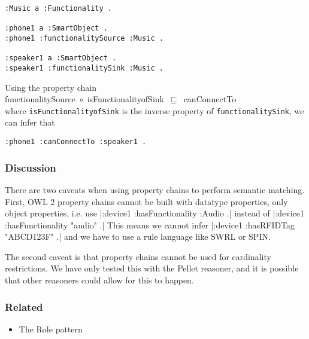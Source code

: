 \begin{verbatim}               
:Music a :Functionality .

:phone1 a :SmartObject .
:phone1 :functionalitySource :Music . 
              
:speaker1 a :SmartObject .
:speaker1 :functionalitySink :Music . 
\end{verbatim}

Using the property chain\\

\noindent
functionalitySource~\ensuremath{\circ}~isFunctionalityofSink~\ensuremath{\sqsubseteq}~canConnectTo\\

where \texttt{isFunctionalityofSink} is the inverse property of \texttt{functionality\-Sink}, we can infer that

\begin{verbatim}               
:phone1 :canConnectTo :speaker1 .
\end{verbatim}


\subsubsection{Discussion}

There are two caveats when using property chains to perform semantic matching. First, \ac{OWL} 2 property chains cannot be built with datatype properties, only object properties, i.e. use |:device1 :hasFunctionality :Audio .| instead of |:device1 :hasFunctionality "audio" .| This means we cannot infer |:device1 :hasRFIDTag "ABCD123F" .| and we have to use a rule language like \ac{SWRL} or \ac{SPIN}.

The second caveat is that property chains cannot be used for cardinality restrictions. We have only tested this with the Pellet reasoner, and it is possible that other reasoners could allow for this to happen.

\subsubsection{Related}

\begin{itemize}
	\item The Role pattern
\end{itemize}




